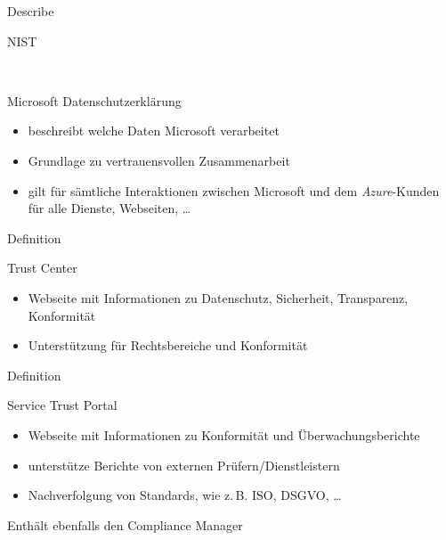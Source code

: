 \documentclass{scrartcl}
\newenvironment{flashcard}[2][]{%
    #1
    \vfill
    \centerline{\Large{#2}}
    \vfill
\newpage
}
{\newpage}
\begin{document}
    \begin{flashcard}[Describe]{NIST}

    \end{flashcard}

    \begin{flashcard}[\ ]{Microsoft Datenschutzerklärung}
        \begin{itemize}
            \item beschreibt welche Daten Microsoft verarbeitet
            \item Grundlage zu vertrauensvollen Zusammenarbeit
            \item gilt für sämtliche Interaktionen zwischen Microsoft und dem \emph{Azure}-Kunden für alle Dienste, Webseiten, \ldots
        \end{itemize}
    \end{flashcard}

    \begin{flashcard}[Definition]{Trust Center}
        \begin{itemize}
            \item Webseite mit Informationen zu Datenschutz, Sicherheit, Transparenz, Konformität
            \item Unterstützung für Rechtsbereiche und Konformität
        \end{itemize}
    \end{flashcard}

    \begin{flashcard}[Definition]{Service Trust Portal}
        \begin{itemize}
            \item Webseite mit Informationen zu Konformität und Überwachungsberichte
            \item unterstütze Berichte von externen Prüfern/Dienstleistern
            \item Nachverfolgung von Standards, wie z.\,B. ISO, DSGVO, \ldots
        \end{itemize}
        
        \vspace{5mm}
        Enthält ebenfalls den Compliance Manager
    \end{flashcard}
\end{document}
